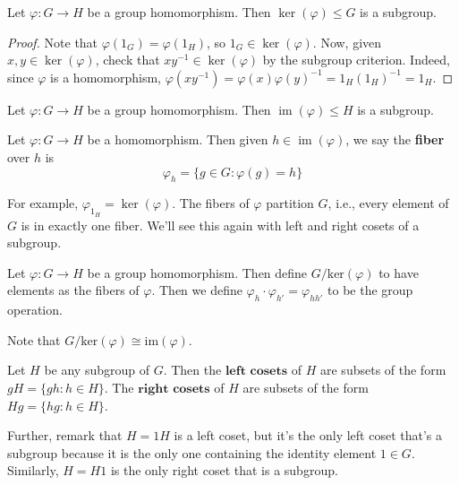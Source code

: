 \documentclass{article}
\theoremstyle{plain}
\begin{document}
\begin{theorem}{}{}
Let $\varphi : G \to H$ be a group homomorphism. Then $\operatorname{ker}(\varphi) \le G$ is a subgroup.
\end{theorem}
\begin{proof}
Note that $\varphi(1_G) = \varphi(1_H)$, so $1_G \in \operatorname{ker}(\varphi)$. Now, given $x,y \in \operatorname{ker}(\varphi)$, check that $xy^{-1} \in \operatorname{ker}(\varphi)$ by the subgroup criterion. Indeed, since $\varphi$ is a homomorphism, $\varphi(xy^{-1}) = \varphi(x)\varphi(y)^{-1} = 1_H(1_H)^{-1} = 1_H$.
\end{proof}
\begin{theorem}{}{}
Let $\varphi : G \to H$ be a group homomorphism. Then $\operatorname{im}(\varphi) \le H$ is a subgroup.
\end{theorem}
\begin{definition}{}{}
Let $\varphi : G\to H$ be a homomorphism. Then given $h \in \operatorname{im}(\varphi)$, we say the \textbf{fiber} over $h$ is $$\varphi_h = \{ g \in G : \varphi(g) = h \}$$
\end{definition}
For example, $\varphi_{1_H} = \operatorname{ker}(\varphi)$. The fibers of $\varphi$ partition $G$, i.e., every element of $G$ is in exactly one fiber. We'll see this again with left and right cosets of a subgroup.

\begin{definition}{}{}
Let $\varphi : G \to H$ be a group homomorphism. Then define $G/\text{ker}(\varphi)$ to have elements as the fibers of $\varphi$. Then we define $\varphi_h\cdot\varphi_{h'}=\varphi_{hh'}$ to be the group operation.
\end{definition}
Note that $G/\text{ker}(\varphi) \cong \text{im}(\varphi)$.

\begin{definition}{}{}
Let $H$ be any subgroup of $G$. Then the $\textbf{left cosets}$ of $H$ are subsets of the form $gH = \{ gh : h \in H \}$. The $\textbf{right cosets}$ of $H$ are subsets of the form $Hg = \{ hg : h \in H \}$.
\end{definition}
Further, remark that $H = 1H$ is a left coset, but it's the only left coset that's a subgroup because it is the only one containing the identity element $1 \in G$. Similarly, $H=H1$ is the only right coset that is a subgroup.
\end{document}
